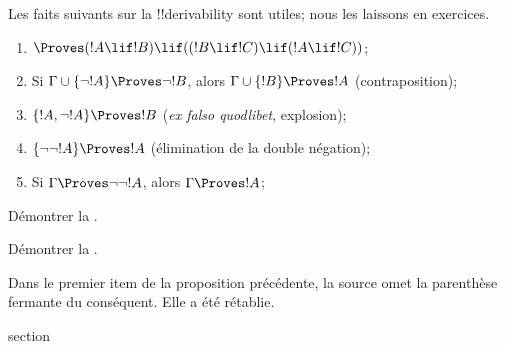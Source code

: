 \documentclass[11pt,a4paper,openany]{memoir}
\begin{document}
Les faits suivants sur la !!{derivability} sont utiles; nous les
laissons en exercices.

\begin{prop}
\begin{enumerate}
\item $\Proves (!A \lif !B) \lif ((!B \lif !C)
  \lif (!A \lif !C))$; 
\item Si $\Gamma \cup \{\lnot !A\} \Proves \lnot !B$, alors
  $\Gamma \cup \{!B\} \Proves !A$ (contraposition);
\item $\{!A, \lnot !A\} \Proves !B$ (\emph{ex falso quodlibet},
  explosion); 
\item $\{\lnot\lnot !A\} \Proves !A$ (élimination de la double
  négation); 
\item Si $\Gamma \Proves \lnot\lnot !A$, alors
  $\Gamma \Proves !A$; 
\end{enumerate}
\end{prop}

\begin{prob}
Démontrer la .
\end{prob}
\tagendprob

\begin{prob}
Démontrer la .
\end{prob}
\tagendprob

\begin{editorial}
Dans le premier item de la proposition précédente, la source omet la
parenthèse fermante du conséquent. Elle a été rétablie.
\end{editorial}


\endgroup




\begingroup
\expandafter\def\csname ol@sectioncs\endcsname{section}
\def\olfilename{provability-consistency}


      {}
      {}
\end{document}
